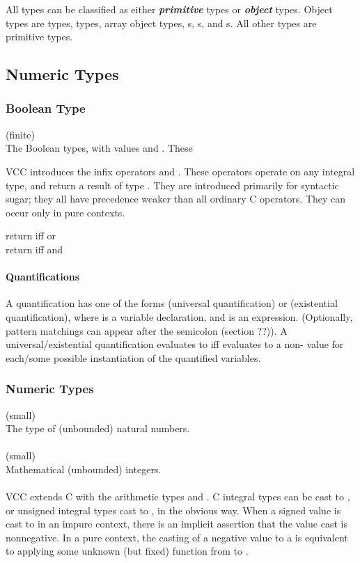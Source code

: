 \documentclass[preprint,nocopyrightspace]{sigplanconf}
\newcommand{\subsubsubsection}[1]{\paragraph{#1}}
\newcommand{\Def}[1]{\textit{\textbf{#1}}}
\begin{document}
{All types can be classified as either \Def{primitive} types
or \Def{object} types. Object types are 
types,  types, array object types, \vcc{\thread}s, 
\vcc{\claim}s, and \vcc{\blob}s. All other types are primitive types.

\subsection{Numeric Types}

\subsubsection{Boolean Type}

\vcc{\bool} (finite)\\
The Boolean types, with values \vcc{\true} and \vcc{\false}. These 

VCC introduces the infix operators \vcc{==>}
and \vcc{<==>}. These operators operate on any integral type, and
return a result of type \vcc{\bool}. They are introduced primarily
for syntactic sugar; they all have precedence weaker than all ordinary
C operators. They can occur only in pure contexts.

 return \vcc{\true} iff  or \\
 return \vcc{\true} iff  and \\

\subsubsubsection{Quantifications}

A quantification has one of the forms
 (universal quantification) or 
 (existential quantification), 
where  is a variable declaration, and 
is an expression. (Optionally, pattern matchings can appear after the
semicolon (section ??)). A universal/existential quantification evaluates
to \vcc{\true} iff  evaluates to a non-\vcc{\false} value for
each/some possible instantiation of the quantified variables.

\subsubsection{Numeric Types}

\vcc{\natural} (small)\\
The type of (unbounded) natural numbers. 
\\\\
\vcc{\integer} (small)\\
Mathematical (unbounded) integers. 
\\\\
VCC extends C with the arithmetic types \vcc{\natural}
and \vcc{\integer}. C integral types can be cast to \vcc{\integer},
or unsigned integral types cast to \vcc{\natural}, in the obvious
way. When a signed value is cast to \vcc{\natural} in an impure
context, there is an implicit assertion that the value cast is
nonnegative. In a pure context, the casting of a negative value to 
a \vcc{\natural} is equivalent to applying some unknown (but fixed)
function from  to . 

}
\end{document}
